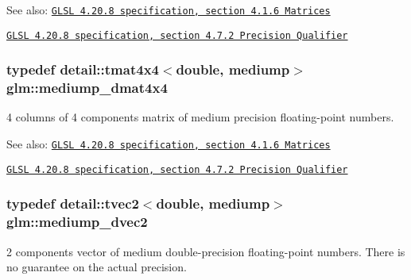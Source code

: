 \begin{Desc}
\item[See also:]\href{http://www.opengl.org/registry/doc/GLSLangSpec.4.20.8.pdf}{\tt GLSL 4.20.8 specification, section 4.1.6 Matrices} 

\href{http://www.opengl.org/registry/doc/GLSLangSpec.4.20.8.pdf}{\tt GLSL 4.20.8 specification, section 4.7.2 Precision Qualifier} \end{Desc}
\hypertarget{group__core__precision_gd64329d45b05417ccf0cc3c23f584d26}{
\subsubsection[mediump\_\-dmat4x4]{\setlength{\rightskip}{0pt plus 5cm}typedef detail::tmat4x4$<$double, mediump$>$ {\bf glm::mediump\_\-dmat4x4}}}
\label{group__core__precision_gd64329d45b05417ccf0cc3c23f584d26}


4 columns of 4 components matrix of medium precision floating-point numbers.

\begin{Desc}
\item[See also:]\href{http://www.opengl.org/registry/doc/GLSLangSpec.4.20.8.pdf}{\tt GLSL 4.20.8 specification, section 4.1.6 Matrices} 

\href{http://www.opengl.org/registry/doc/GLSLangSpec.4.20.8.pdf}{\tt GLSL 4.20.8 specification, section 4.7.2 Precision Qualifier} \end{Desc}
\hypertarget{group__core__precision_gce1f1cc2eb8e978dcb60e682af87b541}{
\subsubsection[mediump\_\-dvec2]{\setlength{\rightskip}{0pt plus 5cm}typedef detail::tvec2$<$double, mediump$>$ {\bf glm::mediump\_\-dvec2}}}
\label{group__core__precision_gce1f1cc2eb8e978dcb60e682af87b541}


2 components vector of medium double-precision floating-point numbers. There is no guarantee on the actual precision.

